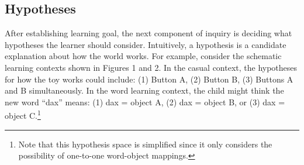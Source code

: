 \documentclass[english,floatsintext,man]{apa6}
\theoremstyle{definition}
\theoremstyle{definition}
\theoremstyle{definition}
\theoremstyle{remark}
\begin{document}

\subsection{Hypotheses}\label{hypotheses}

After establishing learning goal, the next component of inquiry is
deciding what hypotheses the learner should consider. Intuitively, a
hypothesis is a candidate explanation about how the world works. For
example, consider the schematic learning contexts shown in Figures 1 and
2. In the casual context, the hypotheses for how the toy works could
include: (1) Button A, (2) Button B, (3) Buttons A and B simultaneously.
In the word learning context, the child might think the new word
\enquote{dax} means: (1) dax = object A, (2) dax = object B, or (3) dax
= object C.\footnote{Note that this hypothesis space is simplified since
  it only considers the possibility of one-to-one word-object mappings.}
\end{document}

